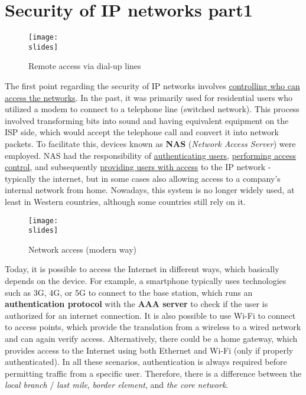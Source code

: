 \chapter{Security of IP networks part1}

\begin{figure}[h]
    \centering
    \texttt{[image: \\slides]}
    \caption{Remote access via dial-up lines}
\end{figure}

The first point regarding the security of IP networks involves \ul{controlling who can access the networks}.
In the past, it was primarily used for residential users who utilized a modem to connect to a telephone line (switched network).
This process involved transforming bits into sound and having equivalent equipment on the ISP side, which would accept the telephone call and convert it into network packets.
To facilitate this, devices known as \textbf{NAS} (\textit{Network Access Server}) were employed.
NAS had the responsibility of \underline{authenticating users}, \underline{performing access control}, and subsequently \underline{providing users with access} to the IP network - typically the internet, but in some cases also allowing access to a company's internal network from home.
Nowadays, this system is no longer widely used, at least in Western countries, although some countries still rely on it.


\begin{figure}[h]
    \centering
    \texttt{[image: \\slides]}
    \caption{Network access (modern way)}
\end{figure}

Today, it is possible to access the Internet in different ways, which basically depends on the device.
For example, a smartphone typically uses technologies such as 3G, 4G, or 5G to connect to the base station, which runs an \textbf{authentication protocol} with the \textbf{AAA server} to check if the user is authorized for an internet connection.
It is also possible to use Wi-Fi to connect to access points, which provide the translation from a wireless to a wired network and can again verify access.
Alternatively, there could be a home gateway, which provides access to the Internet using both Ethernet and Wi-Fi (only if properly authenticated).
In all these scenarios, authentication is always required before permitting traffic from a specific user.
Therefore, there is a difference between the \textit{local branch} / \textit{last mile}, \textit{border element}, and \textit{the core network}.



